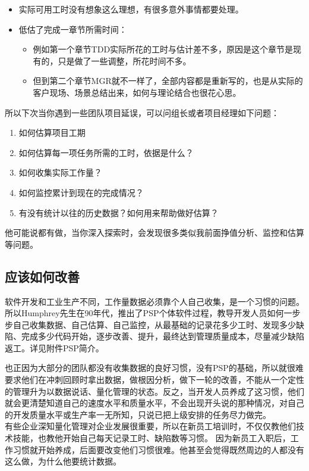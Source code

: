 \begin{itemize}
\tightlist
\item
  实际可用工时没有想象这么理想，有很多意外事情都要处理。
\item
  低估了完成一章节所需时间：

  \begin{itemize}
  \tightlist
  \item
    例如第一个章节TDD实际所花的工时与估计差不多，原因是这个章节是现有的，只是做了一些调整，所花时间不多。
  \item
    但到第二个章节MGR就不一样了，全部内容都是重新写的，也是从实际的客户现场、场景总结出来，如何与理论结合也很花心思。
  \end{itemize}
\end{itemize}

所以下次当你遇到一些团队项目延误，可以问组长或者项目经理如下问题：

\begin{enumerate}
\tightlist
\item
  如何估算项目工期\\
\item
  如何估算每一项任务所需的工时，依据是什么？\\
\item
  如何收集实际工作量？\\
\item
  如何监控累计到现在的完成情况？\\
\item
  有没有统计以往的历史数据？如何用来帮助做好估算？\\
\end{enumerate}

他可能说都有做，当你深入探索时，会发现很多类似我前面挣值分析、监控和估算等问题。

\hypertarget{ux5e94ux8be5ux5982ux4f55ux6539ux5584}{%
\subsection{应该如何改善}\label{ux5e94ux8be5ux5982ux4f55ux6539ux5584}}

软件开发和工业生产不同，工作量数据必须靠个人自己收集，是一个习惯的问题。所以Humphrey先生在90年代，推出了PSP个体软件过程，教导开发人员如何一步步自己收集数据、自己估算、自己监控，从最基础的记录花多少工时、发现多少缺陷、完成多少代码开始，逐步改善、提升，最终达到管理质量成本，尽量减少缺陷返工。详见附件PSP简介。

也正因为大部分的团队都没有收集数据的良好习惯，没有PSP的基础，所以就很难要求他们在冲刺回顾时拿出数据，做根因分析，做下一轮的改善，不能从一个定性的管理升为以数据说话、量化管理的状态。反之，当开发人员养成了这习惯，他们就会更清楚知道自己的速度水平和质量水平，不会出现开头说的那种情况，对自己的开发质量水平或生产率一无所知，只说已把上级安排的任务尽力做完。\\
有些企业深知量化管理对企业发展很重要，所以在新员工培训时，不仅仅教他们技术技能，也教他开始自己每天记录工时、缺陷数等习惯。
因为新员工入职后，工作习惯就开始养成，后面要改变他们习惯很难。他甚至会觉得既然周边的人都没有这么做，为什么他要统计数据。

